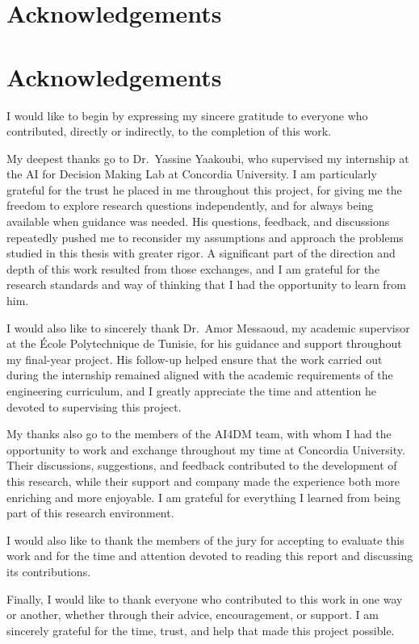 \chapter*{Acknowledgements}
{}
\chapter*{Acknowledgements}


I would like to begin by expressing my sincere gratitude to everyone who contributed, directly or 
indirectly, to the completion of this work.


My deepest thanks go to Dr.~Yassine Yaakoubi, who supervised my internship at the AI for Decision 
Making Lab at Concordia University. I am particularly grateful for the trust he placed in me throughout 
this project, for giving me the freedom to explore research questions independently, and for always being 
available when guidance was needed. His questions, feedback, and discussions repeatedly pushed me to reconsider 
my assumptions and approach the problems studied in this thesis with greater rigor. A significant part of the 
direction and depth of this work resulted from those exchanges, and I am grateful for the research standards 
and way of thinking that I had the opportunity to learn from him.


I would also like to sincerely thank Dr.~Amor Messaoud, my academic supervisor at the École Polytechnique de Tunisie, 
for his guidance and support throughout my final-year project. His follow-up helped ensure that the work carried out 
during the internship remained aligned with the academic requirements of the engineering curriculum, and I greatly 
appreciate the time and attention he devoted to supervising this project.


My thanks also go to the members of the AI4DM team, with whom I had the opportunity to work and exchange 
throughout my time at Concordia University. Their discussions, suggestions, and feedback contributed to the 
development of this research, while their support and company made the experience both more enriching and more 
enjoyable. I am grateful for everything I learned from being part of this research environment.


I would also like to thank the members of the jury for accepting to evaluate this work and for the time 
and attention devoted to reading this report and discussing its contributions.


Finally, I would like to thank everyone who contributed to this work in one way
or another, whether through their advice, encouragement, or support. I am
sincerely grateful for the time, trust, and help that made this project possible.

\vspace{1cm} %

\noindent

